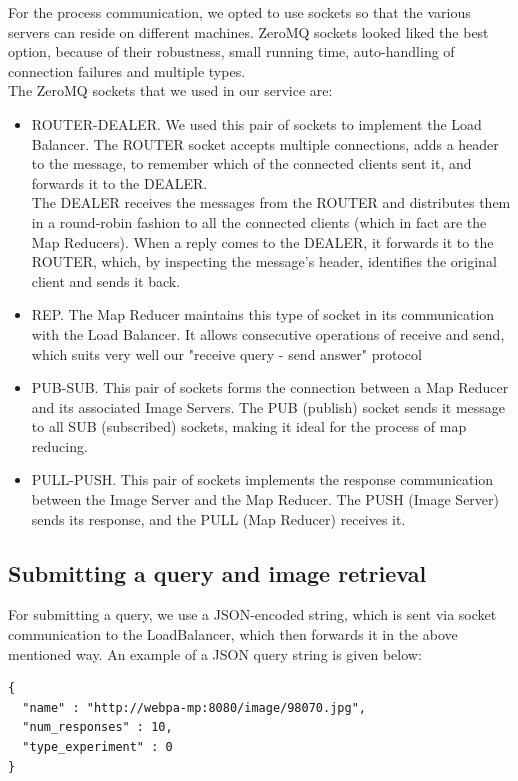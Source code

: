 For the process communication, we opted to use sockets so that the various servers can reside on different machines.
ZeroMQ sockets \cite{zeromq} looked liked the best option, because of their robustness, small running time, auto-handling of connection failures and multiple types.\\
The ZeroMQ sockets that we used in our service are:
\begin{itemize}
	\item ROUTER-DEALER. We used this pair of sockets to implement the Load Balancer. The ROUTER socket accepts multiple connections, adds a header to the message, to remember which of the connected clients sent it, and forwards it to the DEALER.\\
	The DEALER receives the messages from the ROUTER and distributes them in a round-robin fashion to all the connected clients (which in fact are the Map Reducers). When a reply comes to the DEALER, it forwards it to the ROUTER, which, by inspecting the message's header, identifies the original client and sends it back.
	\item REP. The Map Reducer maintains this type of socket in its communication with the Load Balancer. It allows consecutive operations of receive and send, which suits very well our "receive query - send answer" protocol
	\item PUB-SUB. This pair of sockets forms the connection between a Map Reducer and its associated Image Servers.
	The PUB (publish) socket sends it message to all SUB (subscribed) sockets, making it ideal for the process of map reducing.
	\item PULL-PUSH. This pair of sockets implements the response communication between the Image Server and the Map Reducer. The PUSH (Image Server) sends its response, and the PULL (Map Reducer) receives it.
\end{itemize}

\subsection{Submitting a query and image retrieval}

For submitting a query, we use a JSON-encoded string, which is sent via socket communication to the LoadBalancer, which then forwards it in the above mentioned way. An example of a JSON query string is given below:

\begin{lstlisting}[caption=Query JSON]
{
  "name" : "http://webpa-mp:8080/image/98070.jpg",
  "num_responses" : 10,
  "type_experiment" : 0
}
\end{lstlisting}


